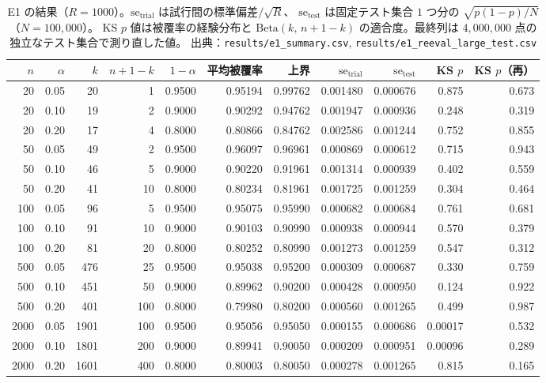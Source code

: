 \documentclass[a4paper,11pt]{jsarticle}
\theoremstyle{definition}
\theoremstyle{plain}
\theoremstyle{remark}
\begin{document}
\begin{table}[htbp]
  \centering
  \caption{E1 の結果（$R=1000$）。$\mathrm{se}_{\mathrm{trial}}$ は試行間の標準偏差$/\sqrt{R}$、
    $\mathrm{se}_{\mathrm{test}}$ は固定テスト集合 $1$ つ分の $\sqrt{p(1-p)/N}$（$N=100{,}000$）。
    KS $p$ 値は被覆率の経験分布と $\mathrm{Beta}(k,\,n+1-k)$ の適合度。最終列は
    $4{,}000{,}000$ 点の独立なテスト集合で測り直した値。
    出典：\texttt{results/e1\_summary.csv}, \texttt{results/e1\_reeval\_large\_test.csv}}
  \label{tab:e1-summary}
  \footnotesize
  \setlength{\tabcolsep}{3.5pt}
  \begin{tabular}{rrrrrrrrrrr}
    \toprule
    $n$ & $\alpha$ & $k$ & $n{+}1{-}k$ & $1-\alpha$ & 平均被覆率 & 上界 & $\mathrm{se}_{\mathrm{trial}}$ & $\mathrm{se}_{\mathrm{test}}$ & KS $p$ & KS $p$（再） \\
    \midrule
    20 & 0.05 & 20 & 1 & 0.9500 & 0.95194 & 0.99762 & 0.001480 & 0.000676 & 0.875 & 0.673 \\
    20 & 0.10 & 19 & 2 & 0.9000 & 0.90292 & 0.94762 & 0.001947 & 0.000936 & 0.248 & 0.319 \\
    20 & 0.20 & 17 & 4 & 0.8000 & 0.80866 & 0.84762 & 0.002586 & 0.001244 & 0.752 & 0.855 \\
    50 & 0.05 & 49 & 2 & 0.9500 & 0.96097 & 0.96961 & 0.000869 & 0.000612 & 0.715 & 0.943 \\
    50 & 0.10 & 46 & 5 & 0.9000 & 0.90220 & 0.91961 & 0.001314 & 0.000939 & 0.402 & 0.559 \\
    50 & 0.20 & 41 & 10 & 0.8000 & 0.80234 & 0.81961 & 0.001725 & 0.001259 & 0.304 & 0.464 \\
    100 & 0.05 & 96 & 5 & 0.9500 & 0.95075 & 0.95990 & 0.000682 & 0.000684 & 0.761 & 0.681 \\
    100 & 0.10 & 91 & 10 & 0.9000 & 0.90103 & 0.90990 & 0.000938 & 0.000944 & 0.570 & 0.379 \\
    100 & 0.20 & 81 & 20 & 0.8000 & 0.80252 & 0.80990 & 0.001273 & 0.001259 & 0.547 & 0.312 \\
    500 & 0.05 & 476 & 25 & 0.9500 & 0.95038 & 0.95200 & 0.000309 & 0.000687 & 0.330 & 0.759 \\
    500 & 0.10 & 451 & 50 & 0.9000 & 0.89962 & 0.90200 & 0.000428 & 0.000950 & 0.124 & 0.922 \\
    500 & 0.20 & 401 & 100 & 0.8000 & 0.79980 & 0.80200 & 0.000560 & 0.001265 & 0.499 & 0.987 \\
    2000 & 0.05 & 1901 & 100 & 0.9500 & 0.95056 & 0.95050 & 0.000155 & 0.000686 & 0.00017 & 0.532 \\
    2000 & 0.10 & 1801 & 200 & 0.9000 & 0.89941 & 0.90050 & 0.000209 & 0.000951 & 0.00096 & 0.289 \\
    2000 & 0.20 & 1601 & 400 & 0.8000 & 0.80003 & 0.80050 & 0.000278 & 0.001265 & 0.815 & 0.165 \\
    \bottomrule
  \end{tabular}
\end{table}
\end{document}
